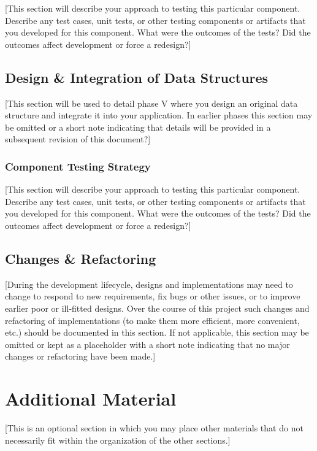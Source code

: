 \documentclass[12pt]{scrartcl} %
\begin{document}
[This section will describe your approach to testing this particular component.  Describe any test cases, unit tests, or other testing components or artifacts that you developed for this component.  What were the outcomes of the tests?  Did the outcomes affect development or force a redesign?]

\subsection{Design \& Integration of Data Structures}

[This section will be used to detail phase V where you design an original data structure and integrate it into your application.  In earlier phases this section may be omitted or a short note indicating that details will be provided in a subsequent revision of this document?]

\subsubsection{Component Testing Strategy}

[This section will describe your approach to testing this particular component.  Describe any test cases, unit tests, or other testing components or artifacts that you developed for this component.  What were the outcomes of the tests?  Did the outcomes affect development or force a redesign?]

\subsection{Changes \& Refactoring}

[During the development lifecycle, designs and implementations may need to change to respond to new   requirements, fix bugs or other issues, or to improve earlier poor or ill-fitted designs.  Over the course of this project such changes and refactoring of implementations (to make them more efficient, more convenient, etc.) should be documented in this section.  If not applicable, this section may be omitted or kept as a placeholder with a short note indicating that no major changes or refactoring have been made.]

\section{Additional Material}

[This is an optional section in which you may place other materials that do not necessarily fit within the organization of the other sections.]

\nocite{*}

%

\end{document}
